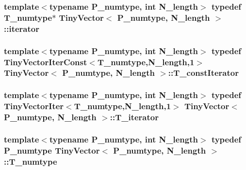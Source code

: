 \subsubsection[{iterator}]{\setlength{\rightskip}{0pt plus 5cm}template$<$typename P\+\_\+numtype, int N\+\_\+length$>$ typedef {\bf T\+\_\+numtype}$\ast$ {\bf Tiny\+Vector}$<$ P\+\_\+numtype, N\+\_\+length $>$\+::{\bf iterator}}\label{classTinyVector_a7e1e065c0b894add536ab278dfe28202}
\hypertarget{classTinyVector_af420f8f49beb7efac60ac22a5d1f2e84}{}
\subsubsection[{T\+\_\+const\+Iterator}]{\setlength{\rightskip}{0pt plus 5cm}template$<$typename P\+\_\+numtype, int N\+\_\+length$>$ typedef {\bf Tiny\+Vector\+Iter\+Const}$<${\bf T\+\_\+numtype},N\+\_\+length,1$>$ {\bf Tiny\+Vector}$<$ P\+\_\+numtype, N\+\_\+length $>$\+::{\bf T\+\_\+const\+Iterator}}\label{classTinyVector_af420f8f49beb7efac60ac22a5d1f2e84}
\hypertarget{classTinyVector_a6044134b6f2401fe4e2d73bd7dfa25c7}{}
\subsubsection[{T\+\_\+iterator}]{\setlength{\rightskip}{0pt plus 5cm}template$<$typename P\+\_\+numtype, int N\+\_\+length$>$ typedef {\bf Tiny\+Vector\+Iter}$<${\bf T\+\_\+numtype},N\+\_\+length,1$>$ {\bf Tiny\+Vector}$<$ P\+\_\+numtype, N\+\_\+length $>$\+::{\bf T\+\_\+iterator}}\label{classTinyVector_a6044134b6f2401fe4e2d73bd7dfa25c7}
\hypertarget{classTinyVector_ab8e7df758dd5a369e92b3cb54a48bdbe}{}
\subsubsection[{T\+\_\+numtype}]{\setlength{\rightskip}{0pt plus 5cm}template$<$typename P\+\_\+numtype, int N\+\_\+length$>$ typedef P\+\_\+numtype {\bf Tiny\+Vector}$<$ P\+\_\+numtype, N\+\_\+length $>$\+::{\bf T\+\_\+numtype}}\label{classTinyVector_ab8e7df758dd5a369e92b3cb54a48bdbe}
\hypertarget{classTinyVector_aea08e4463006acf6842a93c026b27094}{}
